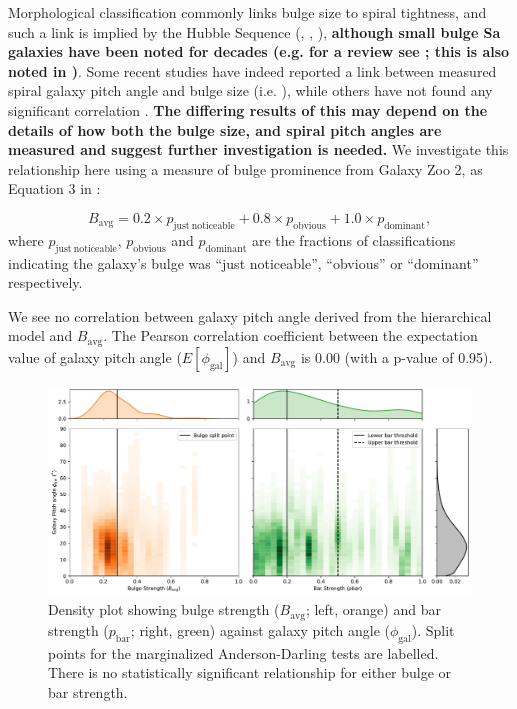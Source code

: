Morphological classification commonly links bulge size to spiral tightness, and such a link is implied by the Hubble Sequence (\citealt{2005ARA&A..43..581S}, \citealt{2009MNRAS.393.1531G}, \citealt{2013seg..book..155B}), \textbf{although small bulge Sa galaxies have been noted for decades (e.g. for a review see \citet{2005ARA&A..43..581S}; this is also noted in \citealt{2019MNRAS.487.1808M})}. Some recent studies have indeed reported a link between measured spiral galaxy pitch angle and bulge size (i.e. \citealt{2019ApJ...873...85D}), while others have not found any significant correlation \citep{2019MNRAS.487.1808M}. \textbf{The differing results of this may depend on the details of how both the bulge size, and spiral pitch angles are measured and suggest further investigation is needed.} We investigate this relationship here using a measure of bulge prominence from Galaxy Zoo 2, as Equation 3 in \citet{2019MNRAS.487.1808M}:

\begin{equation}
  B_\mathrm{avg} = 0.2\times p_\mathrm{just\ noticeable} + 0.8\times p_\mathrm{obvious} + 1.0\times p_\mathrm{dominant},
\end{equation}
where $p_\mathrm{just\ noticeable}$, $p_\mathrm{obvious}$ and $p_\mathrm{dominant}$ are the fractions of classifications indicating the galaxy's bulge was ``just noticeable'', ``obvious'' or ``dominant'' respectively.

We see no correlation between galaxy pitch angle derived from the hierarchical model and $B_\mathrm{avg}$. The Pearson correlation coefficient between the expectation value of galaxy pitch angle ($E[\phi_\mathrm{gal}]$) and $B_\mathrm{avg}$ is 0.00 (with a p-value of 0.95).

\begin{figure}
  \includegraphics[width=17.7cm]{plots/bulge_bar_phigal_distribution.pdf}
  \caption{Density plot showing bulge strength ($B_\mathrm{avg}$; left, orange) and bar strength ($p_\mathrm{bar}$; right, green) against galaxy pitch angle ($\phi_\mathrm{gal}$). Split points for the marginalized Anderson-Darling tests are labelled. There is no statistically significant relationship for either bulge or bar strength.}
  \label{fig:bulge-bar-pa-hist}
\end{figure}

